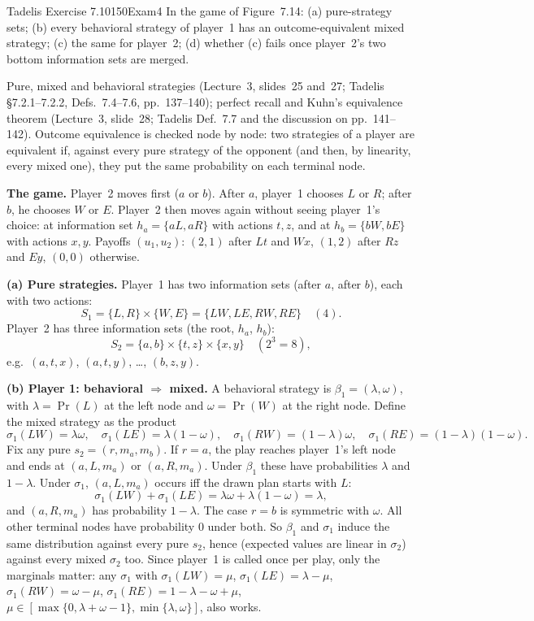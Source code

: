 \begin{exsol}{Tadelis Exercise 7.10}{150}{Exam}{4}
\asked In the game of Figure~7.14: (a) pure-strategy sets; (b) every behavioral strategy of
player~1 has an outcome-equivalent mixed strategy; (c) the same for player~2; (d) whether (c)
fails once player~2's two bottom information sets are merged.

\method Pure, mixed and behavioral strategies (Lecture~3, slides~25 and~27; Tadelis \S7.2.1--7.2.2,
Defs.~7.4--7.6, pp.~137--140); perfect recall and Kuhn's equivalence theorem (Lecture~3, slide~28;
Tadelis Def.~7.7 and the discussion on pp.~141--142). Outcome equivalence is checked node by node:
two strategies of a player are equivalent if, against every pure strategy of the opponent (and
then, by linearity, every mixed one), they put the same probability on each terminal node.

\solution
\textbf{The game.} Player~2 moves first ($a$ or $b$). After $a$, player~1 chooses $L$ or $R$;
after $b$, he chooses $W$ or $E$. Player~2 then moves again without seeing player~1's choice: at
information set $h_a = \{aL, aR\}$ with actions $t, z$, and at $h_b = \{bW, bE\}$ with actions
$x, y$. Payoffs $(u_1,u_2)$: $(2,1)$ after $Lt$ and $Wx$, $(1,2)$ after $Rz$ and $Ey$, $(0,0)$
otherwise.

\textbf{(a) Pure strategies.} Player~1 has two information sets (after $a$, after $b$), each with
two actions:
\[
  S_1 = \{L, R\} \times \{W, E\} = \{LW, LE, RW, RE\} \quad (4).
\]
Player~2 has three information sets (the root, $h_a$, $h_b$):
\[
  S_2 = \{a, b\} \times \{t, z\} \times \{x, y\} \quad (2^3 = 8),
\]
e.g.\ $(a, t, x)$, $(a, t, y)$, \dots, $(b, z, y)$.

\textbf{(b) Player 1: behavioral $\Rightarrow$ mixed.} A behavioral strategy is $\beta_1 = (\lambda,
\omega)$, with $\lambda = \Pr(L)$ at the left node and $\omega = \Pr(W)$ at the right node. Define
the mixed strategy as the product
\[
  \sigma_1(LW) = \lambda\omega,\quad \sigma_1(LE) = \lambda(1-\omega),\quad
  \sigma_1(RW) = (1-\lambda)\omega,\quad \sigma_1(RE) = (1-\lambda)(1-\omega).
\]
Fix any pure $s_2 = (r, m_a, m_b)$. If $r = a$, the play reaches player~1's left node and ends at
$(a, L, m_a)$ or $(a, R, m_a)$. Under $\beta_1$ these have probabilities $\lambda$ and $1-\lambda$.
Under $\sigma_1$, $(a, L, m_a)$ occurs iff the drawn plan starts with $L$:
\[
  \sigma_1(LW) + \sigma_1(LE) = \lambda\omega + \lambda(1-\omega) = \lambda,
\]
and $(a, R, m_a)$ has probability $1 - \lambda$. The case $r = b$ is symmetric with $\omega$. All other
terminal nodes have probability 0 under both. So $\beta_1$ and $\sigma_1$ induce the same distribution
against every pure $s_2$, hence (expected values are linear in $\sigma_2$) against every mixed
$\sigma_2$ too. Since player~1 is called once per play, only the marginals matter: any $\sigma_1$ with
$\sigma_1(LW) = \mu$, $\sigma_1(LE) = \lambda - \mu$, $\sigma_1(RW) = \omega - \mu$,
$\sigma_1(RE) = 1 - \lambda - \omega + \mu$, $\mu \in [\max\{0, \lambda+\omega-1\}, \min\{\lambda,
\omega\}]$, also works.


\end{exsol}
